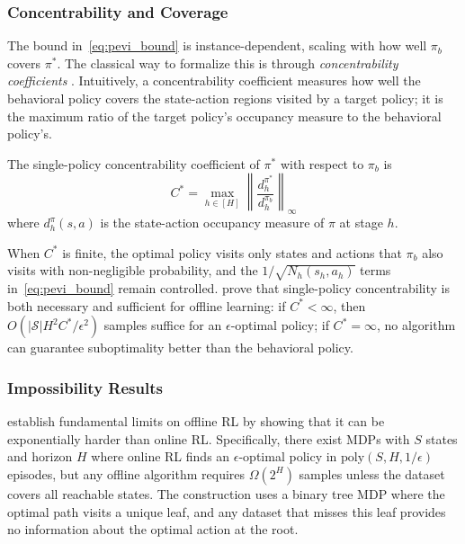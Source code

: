 \subsubsection{Concentrability and Coverage}

The bound in~\eqref{eq:pevi_bound} is instance-dependent, scaling with how well $\pi_b$ covers $\pi^*$. The classical way to formalize this is through \textit{concentrability coefficients} \citep{Munos2008}. Intuitively, a concentrability coefficient measures how well the behavioral policy covers the state-action regions visited by a target policy; it is the maximum ratio of the target policy's occupancy measure to the behavioral policy's.

\begin{definition}
\label{def:concentrability}
The single-policy concentrability coefficient of $\pi^*$ with respect to $\pi_b$ is
\begin{equation}
C^* = \max_{h \in [H]} \left\| \frac{d_h^{\pi^*}}{d_h^{\pi_b}} \right\|_\infty
\end{equation}
where $d_h^{\pi}(s,a)$ is the state-action occupancy measure of $\pi$ at stage $h$.
\end{definition}

When $C^*$ is finite, the optimal policy visits only states and actions that $\pi_b$ also visits with non-negligible probability, and the $1/\sqrt{N_h(s_h, a_h)}$ terms in~\eqref{eq:pevi_bound} remain controlled. \citet{Rashidinejad2021} prove that single-policy concentrability is both necessary and sufficient for offline learning: if $C^* < \infty$, then $O(|\mathcal{S}| H^2 C^* / \epsilon^2)$ samples suffice for an $\epsilon$-optimal policy; if $C^* = \infty$, no algorithm can guarantee suboptimality better than the behavioral policy.

\subsubsection{Impossibility Results}

\citet{Zanette2021} establish fundamental limits on offline RL by showing that it can be exponentially harder than online RL. Specifically, there exist MDPs with $S$ states and horizon $H$ where online RL finds an $\epsilon$-optimal policy in $\text{poly}(S, H, 1/\epsilon)$ episodes, but any offline algorithm requires $\Omega(2^H)$ samples unless the dataset covers all reachable states. The construction uses a binary tree MDP where the optimal path visits a unique leaf, and any dataset that misses this leaf provides no information about the optimal action at the root.

